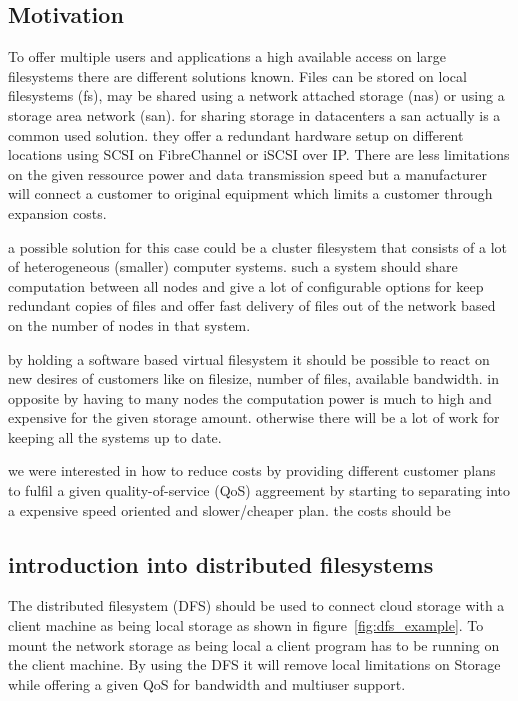 
\subsection{Motivation}
To offer multiple users and applications a high available access on large filesystems there are different solutions known. Files can be stored on local filesystems (fs), may be shared using a network attached storage (nas)  or using a storage area network (san). for sharing storage in datacenters a san actually is a common used solution. they offer a redundant hardware setup on different locations using SCSI on FibreChannel or iSCSI over IP.
There are less limitations on the given ressource power and data transmission speed but a manufacturer will connect a customer to original equipment which limits a customer through expansion costs.

a possible solution for this case could be a cluster filesystem that consists of a lot of heterogeneous (smaller) computer systems. such a system should share computation between all nodes and give a lot of configurable options for keep redundant copies of files and offer fast delivery of files out of the network based on the number of nodes in that system.

by holding a software based virtual filesystem it should be possible to react on new desires of customers like on filesize, number of files, available bandwidth. in opposite by having to many nodes the computation power is much to high and expensive for the given storage amount.  otherwise there will be a lot of work for keeping all the systems up to date. 

we were interested in how to reduce costs by providing different customer plans to fulfil a given quality-of-service (QoS) aggreement by starting to separating into a expensive speed oriented and slower/cheaper plan. the costs should be 

\subsection{introduction into distributed filesystems}

The distributed filesystem (DFS) should be used to connect cloud storage with a client machine as being local storage as shown in figure~\ref{fig:dfs_example}. To mount the network storage as being local a client program has to be running on the client machine. By using the DFS it will remove local limitations on Storage while offering a given QoS for bandwidth and multiuser support.

